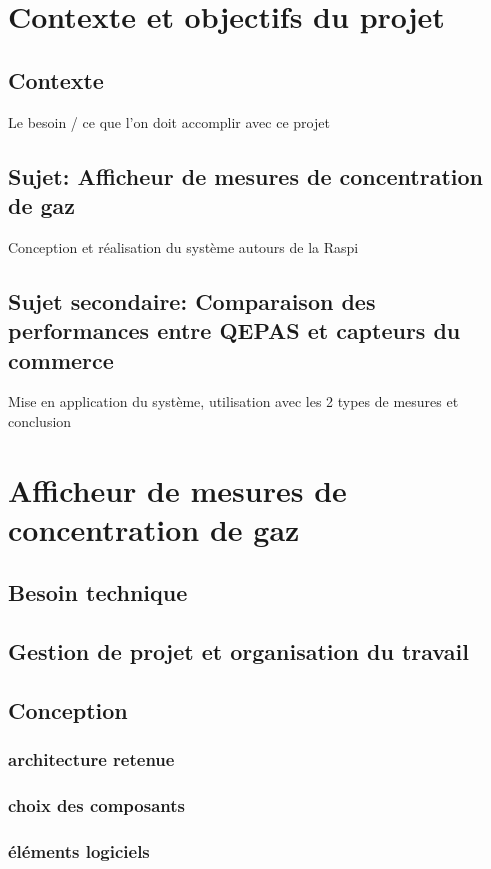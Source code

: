 \documentclass[a4paper]{report}
\begin{document}
	\chapter{Contexte et objectifs du projet}

	
	\section{Contexte}
	Le besoin / ce que l'on doit accomplir avec ce projet
	
	\section{Sujet: Afficheur de mesures de concentration de gaz}
	Conception et réalisation du système autours de la Raspi
		
	\section{Sujet secondaire: Comparaison des performances entre QEPAS et capteurs du commerce}
	Mise en application du système, utilisation avec les 2 types de mesures et conclusion
	
	\chapter{Afficheur de mesures de concentration de gaz}
	
	
	\section{Besoin technique}
	
	\section{Gestion de projet et organisation du travail}
	
	\section{Conception}
	\subsection{architecture retenue}
	\subsection{choix des composants}
	\subsection{éléments logiciels}
\end{document}
